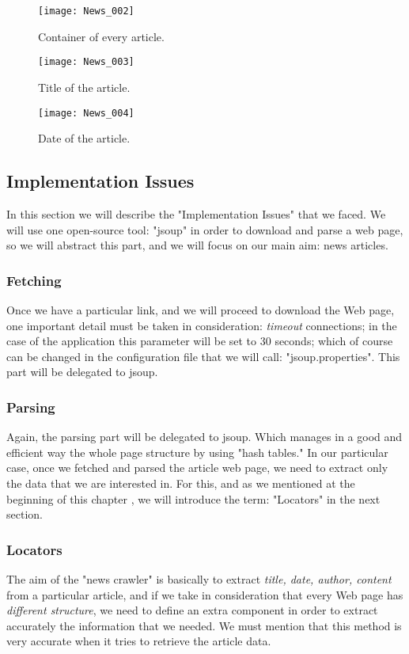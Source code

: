 	\begin{figure}\centering
		\texttt{[image: News\_002]}
		\caption{Container of every article.}\label{fig:News_002}
	\end{figure}
	
	\begin{figure}\centering
		\texttt{[image: News\_003]}
		\caption{Title of the article.}\label{fig:News_003}
	\end{figure}
	
	\begin{figure}\centering
		\texttt{[image: News\_004]}
		\caption{Date of the article.}\label{fig:News_004}
	\end{figure}

\subsection{Implementation Issues}\label{implementationIssues}
In this section we will describe the "Implementation Issues" that we faced.
We will use one open-source tool: "jsoup" in order to download and parse a web page, so we will abstract this part, and we will focus on our main aim: news articles.

\subsubsection{Fetching}\label{fetching}
Once we have a particular link, and we will proceed to download the Web page, one important detail must be taken in consideration: \textit{timeout} connections; in the case of the application this parameter will be set to 30 seconds; which of course can be changed in the configuration file that we will call: "jsoup.properties". This part will be delegated to jsoup.

\subsubsection{Parsing}\label{parsing}
Again, the parsing part will be delegated to jsoup. Which manages in a good and efficient way the whole page structure by using "hash tables." In our particular case, once we fetched and parsed the article web page, we need to extract only the data that we are interested in. For this, and as we mentioned at the beginning of this chapter , we will introduce the term: "Locators" in the next section.

\subsubsection{Locators}\label{locators}
The aim of the "news crawler" is basically to extract \textit{title, date, author, content} from a particular article, and if we take in consideration that every Web page has \emph{different structure}, we need to define an extra component in order to extract accurately the information that we needed. We must mention that this method is very accurate when it tries to retrieve the article data.

